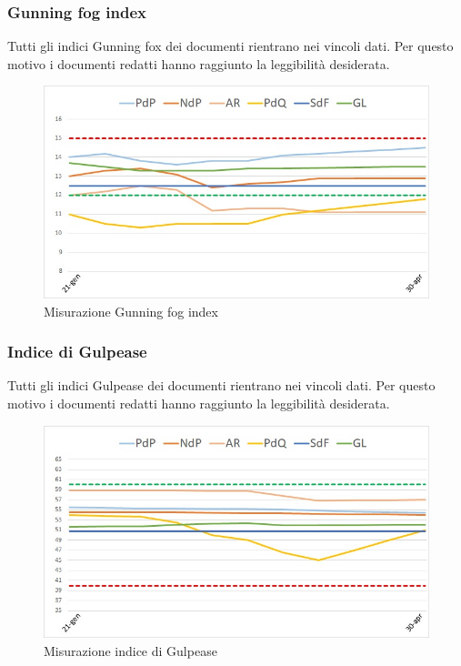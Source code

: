 \subsubsection{Gunning fog index}
Tutti gli indici Gunning fox dei documenti rientrano nei vincoli dati. Per questo motivo i documenti redatti hanno raggiunto la leggibilità desiderata.
\begin{figure} [H]
	\centering
	\includegraphics[scale=1]{Img/fog}
	\caption{Misurazione Gunning fog index}\label{}
\end{figure}

\subsubsection{Indice di Gulpease}
Tutti gli indici Gulpease dei documenti rientrano nei vincoli dati. Per questo motivo i documenti redatti hanno raggiunto la leggibilità desiderata.
\begin{figure} [H]
	\centering
	\includegraphics[scale=1]{Img/gulp}
	\caption{Misurazione indice di Gulpease}\label{}
\end{figure}

